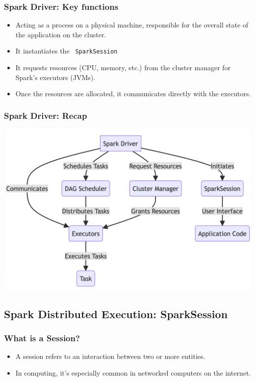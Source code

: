 \begin{frame}
    \frametitle{Spark Driver: Key functions}

    \begin{itemize}
        \item Acting as a process on a physical machine, responsible for the overall state of the application on the cluster.
        \item It instantiates the \texttt{\color{blue} SparkSession}
        \item It requests resources  (CPU, memory, etc.) from the cluster manager for Spark’s executors (JVMs).
        \item Once the resources are allocated, it communicates directly with the executors.
    \end{itemize}

\end{frame}


\begin{frame}
    \frametitle{Spark Driver: Recap}
%
    \includegraphics[width=\textwidth,height=.85\textheight,keepaspectratio]{./Figures/chapter-04/Mairmaid_SparkDriver}

\end{frame}

\subsection{Spark Distributed Execution: SparkSession}\label{subsec:spark-session}
\begin{frame}
    \frametitle{What is a Session?}

    \begin{itemize}
        \item A session refers to an interaction between two or more entities.
        \item In computing, it's especially common in networked computers on the internet.
    \end{itemize}

\end{frame}

